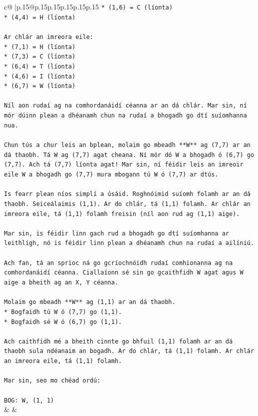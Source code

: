 \documentclass{article}
\begin{document}
{\begin{supertabular}{c@{$\;$}|p{.15\linewidth}@{}p{.15\linewidth}p{.15\linewidth}p{.15\linewidth}p{.15\linewidth}p{.15\linewidth}}
{{{\texttt{*   (1,6) = C (líonta)} \\
\texttt{*   (4,4) = H (líonta)} \\
\\ 
\texttt{Ar chlár an imreora eile:} \\
\texttt{*   (7,1) = H (líonta)} \\
\texttt{*   (7,3) = C (líonta)} \\
\texttt{*   (6,4) = T (líonta)} \\
\texttt{*   (4,6) = I (líonta)} \\
\texttt{*   (6,7) = W (líonta)} \\
\\ 
\texttt{Níl aon rudaí ag na comhordanáidí céanna ar an dá chlár. Mar sin, ní mór dúinn plean a dhéanamh chun na rudaí a bhogadh go dtí suíomhanna nua.} \\
\\ 
\texttt{Chun tús a chur leis an bplean, molaim go mbeadh **W** ag (7,7) ar an dá thaobh. Tá W ag (7,7) agat cheana. Ní mór dó W a bhogadh ó (6,7) go (7,7). Ach tá (7,7) líonta agat! Mar sin, ní féidir leis an imreoir eile W a bhogadh go (7,7) mura mbogann tú W ó (7,7) ar dtús.} \\
\\ 
\texttt{Is fearr plean níos simplí a úsáid. Roghnóimid suíomh folamh ar an dá thaobh. Seiceálaimis (1,1). Ar do chlár, tá (1,1) folamh. Ar chlár an imreora eile, tá (1,1) folamh freisin (níl aon rud ag (1,1) aige).} \\
\\ 
\texttt{Mar sin, is féidir linn gach rud a bhogadh go dtí suíomhanna ar leithligh, nó is féidir linn plean a dhéanamh chun na rudaí a ailíniú.} \\
\\ 
\texttt{Ach fan, tá an sprioc ná go gcríochnóidh rudaí comhionanna ag na comhordanáidí céanna. Ciallaíonn sé sin go gcaithfidh W agat agus W aige a bheith ag an X, Y céanna.} \\
\\ 
\texttt{Molaim go mbeadh **W** ag (1,1) ar an dá thaobh.} \\
\texttt{*   Bogfaidh tú W ó (7,7) go (1,1).} \\
\texttt{*   Bogfaidh sé W ó (6,7) go (1,1).} \\
\\ 
\texttt{Ach caithfidh mé a bheith cinnte go bhfuil (1,1) folamh ar an dá thaobh sula ndéanaim an bogadh. Ar do chlár, tá (1,1) folamh. Ar chlár an imreora eile, tá (1,1) folamh.} \\
\\ 
\texttt{Mar sin, seo mo chéad ordú:} \\
\\ 
\texttt{BOG: W, (1, 1)} \\
            }
        }
    }
    & & \\ \\


\end{supertabular}}
\end{document}
